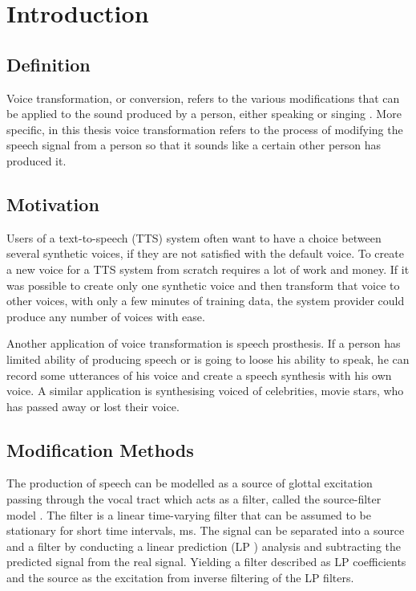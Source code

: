 \chapter{Introduction} %
\label{cha:introduction}
  

\section{Definition} %
\label{sec:definition}
Voice transformation, or conversion, refers to the various modifications that can be applied to the sound produced by a person, either speaking or singing \cite{stylianou08}. More specific, in this thesis voice transformation refers to the process of modifying the speech signal from a person so that it sounds like a certain other person has produced it. 

\section{Motivation} %
\label{sec:motivation}
Users of a text-to-speech (TTS) system often want to have a choice between several synthetic voices, if they are not satisfied with the default voice. To create a new voice for a TTS system from scratch requires a lot of work and money. If it was possible to create only one synthetic voice and then transform that voice to other voices, with only a few minutes of  training data, the system provider could produce any number of voices with ease. 

Another application of voice transformation is speech prosthesis. If a person has limited ability of producing speech or is going to loose his ability to speak, he can record some utterances of his voice and create a speech synthesis with his own voice. A similar application is synthesising voiced of celebrities, \eg movie stars, who has passed away or lost their voice.

\section{Modification Methods} %
\label{sec:synthesis_methods}
The production of speech can be modelled as a source of glottal excitation passing through the vocal tract which acts as a filter, called the source-filter model \cite{taletek}. The filter is a linear time-varying filter that can be assumed to be stationary for short time intervals,  ms. The signal can be separated into a source and a filter by conducting a linear prediction (LP ) analysis and subtracting the predicted signal from the real signal. Yielding a filter described as LP coefficients and the source as the excitation from inverse filtering of the LP filters.

